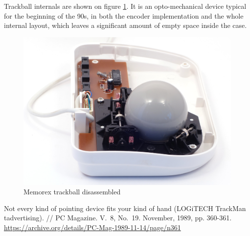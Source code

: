 \documentclass[11pt, a4paper]{article}
\begin{document}
Trackball internals are shown on figure \ref{fig:MemorexInside}. It is an opto-mechanical device typical for the beginning of the 90s, in both the encoder implementation and the whole internal layout, which leaves a significant amount of empty space inside the case.

\begin{figure}[h]
    \centering
    \includegraphics[scale=0.6]{1994_memorex_trackball/inside_30.jpg}
    \caption{Memorex trackball disassembled}
    \label{fig:MemorexInside}
\end{figure}

\begin{thebibliography}{9}
 Not every kind of pointing device fits your kind of hand (LOGiTECH TrackMan tadvertising). // PC Magazine. V.~8, No.~19. November, 1989, pp. 360-361. \url{https://archive.org/details/PC-Mag-1989-11-14/page/n361}
\end{thebibliography}
\end{document}
